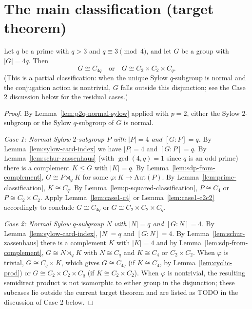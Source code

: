 \section{The main classification (target theorem)}

\begin{theorem}
    \label{thm:classification-4q}
    Let $q$ be a prime with $q > 3$ and $q \equiv 3 \pmod 4$, and let $G$ be
    a group with $|G| = 4q$. Then
    \[
        G \cong C_{4q} \quad \text{or} \quad G \cong C_2 \times C_2 \times C_q.
    \]
    (This is a partial classification: when the unique Sylow $q$-subgroup is
    normal and the conjugation action is nontrivial, $G$ falls outside this
    disjunction; see the Case 2 discussion below for the residual cases.)
\end{theorem}
\begin{proof}
    By Lemma~\ref{lem:p2q-normal-sylow} applied with $p = 2$, either the
    Sylow $2$-subgroup or the Sylow $q$-subgroup of $G$ is normal.

    \emph{Case 1: Normal Sylow $2$-subgroup $P$ with $|P| = 4$ and $[G:P] = q$.}
    By Lemma~\ref{lem:sylow-card-index} we have $|P| = 4$ and $[G:P] = q$. By
    Lemma~\ref{lem:schur-zassenhaus} (with $\gcd(4, q) = 1$ since $q$ is an
    odd prime) there is a complement $K \leq G$ with $|K| = q$. By
    Lemma~\ref{lem:sdp-from-complement}, $G \cong P \rtimes_\varphi K$ for
    some $\varphi : K \to \mathrm{Aut}(P)$. By
    Lemma~\ref{lem:prime-classification}, $K \cong C_q$. By
    Lemma~\ref{lem:p-squared-classification}, $P \cong C_4$ or
    $P \cong C_2 \times C_2$. Apply Lemma~\ref{lem:case1-c4} or
    Lemma~\ref{lem:case1-c2c2} accordingly to conclude
    $G \cong C_{4q}$ or $G \cong C_2 \times C_2 \times C_q$.

    \emph{Case 2: Normal Sylow $q$-subgroup $N$ with $|N| = q$ and $[G:N] = 4$.}
    By Lemma~\ref{lem:sylow-card-index}, $|N| = q$ and $[G:N] = 4$. By
    Lemma~\ref{lem:schur-zassenhaus} there is a complement $K$ with
    $|K| = 4$ and by Lemma~\ref{lem:sdp-from-complement},
    $G \cong N \rtimes_\varphi K$ with $N \cong C_q$ and $K \cong C_4$ or
    $C_2 \times C_2$. When $\varphi$ is trivial, $G \cong C_q \times K$, which
    gives $G \cong C_{4q}$ (if $K \cong C_4$, by
    Lemma~\ref{lem:cyclic-prod}) or $G \cong C_2 \times C_2 \times C_q$ (if
    $K \cong C_2 \times C_2$). When $\varphi$ is nontrivial, the resulting
    semidirect product is not isomorphic to either group in the disjunction;
    these subcases lie outside the current target theorem and are listed as
    TODO in the discussion of Case 2 below.
\end{proof}

